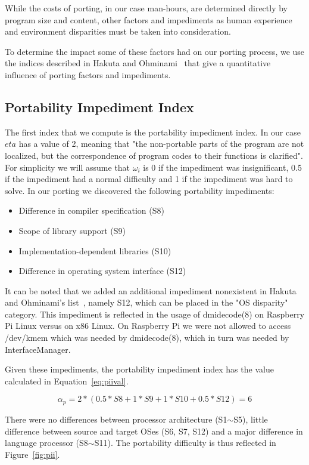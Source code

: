 While the costs of porting, in our case man-hours, are determined directly by
program size and content, other factors and impediments as human experience and
environment disparities must be taken into consideration.

To determine the impact some of these factors had on our porting process, we
use the indices described in Hakuta and Ohminami~\cite{hakuta} that give
a quantitative influence of porting factors and impediments.

\subsection{Portability Impediment Index}

The first index that we compute is the portability impediment index. In our
case $eta$ has a value of 2, meaning that "the non-portable parts of the program
are not localized, but the correspondence of program codes to their functions is
clarified". For simplicity we will assume that $\omega_i$ is 0 if the impediment
was insignificant, 0.5 if the impediment had a normal difficulty and 1 if the
impediment was hard to solve. In our porting we discovered the following
portability impediments:
\begin{itemize}
    \item Difference in compiler specification (S8)
    \item Scope of library support (S9)
    \item Implementation-dependent libraries (S10)
    \item Difference in operating system interface (S12)
\end{itemize}

It can be noted that we added an additional impediment nonexistent in Hakuta and
Ohminami's list~\cite{hakuta}, namely S12, which can be placed in the "OS disparity"
category. This impediment is reflected in the usage of dmidecode(8) on Raspberry
Pi Linux versus on x86 Linux. On Raspberry Pi we were not allowed to access
/dev/kmem which was needed by dmidecode(8), which in turn was needed by
InterfaceManager.

Given these impediments, the portability impediment index has the value
calculated in Equation~\ref{eq:piival}.

\begin{equation} \label{eq:piival}
\alpha_p = 2 * (0.5 * S8 + 1 * S9 + 1 * S10 + 0.5 * S12) = 6
\end{equation}

There were no differences between processor architecture (S1$\sim$S5), little
difference between source and target OSes (S6, S7, S12) and a major difference
in language processor (S8$\sim$S11). The portability difficulty is thus
reflected in Figure~\ref{fig:pii}.

